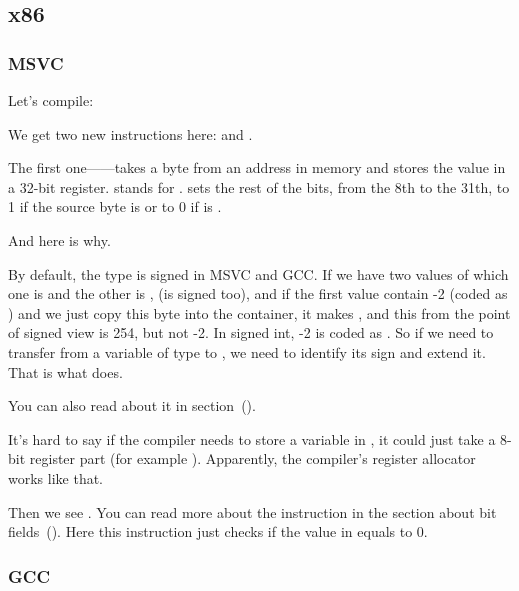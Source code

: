 \subsection{x86}

\subsubsection{\NonOptimizing MSVC}

Let's compile:




We get two new instructions here: \MOVSX and \TEST.

\label{MOVSX}

The first one---\MOVSX---takes a byte from an address in memory and stores the value in a 32-bit register. 
\MOVSX stands for . 
\MOVSX sets the rest of the bits, from the 8th to the 31th, 
to 1 if the source byte is  or to 0 if is .

And here is why.

By default, the \Tchar type is signed in MSVC and GCC. If we have two values of which one is \Tchar 
and the other is \Tint, (\Tint is signed too), and if the first value contain -2 (coded as ) 
and we just copy this byte into the \Tint container, it makes , and this 
from the point of signed \Tint view is 254, but not -2. In signed int, -2 is coded as . 
So if we need to transfer  from a variable of \Tchar type to \Tint, 
we need to identify its sign and extend it. That is what \MOVSX does.

You can also read about it in \q{\IT{\SignedNumbersSectionName}} section~().

It's hard to say if the compiler needs to store a \Tchar variable in \EDX, it could just take a 8-bit register part 
(for example \DL). Apparently, the compiler's \gls{register allocator} works like that.


Then we see . 
You can read more about the \TEST instruction in the section about bit fields~().
Here this instruction just checks if the value in \EDX equals to 0.

\ifdefined\IncludeGCC
\subsubsection{\NonOptimizing GCC}


